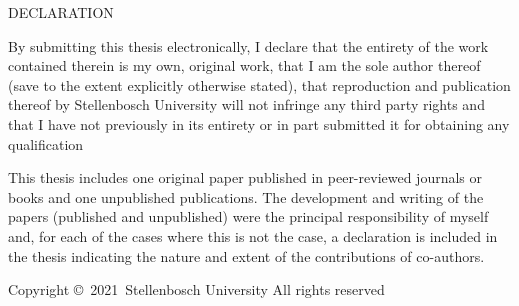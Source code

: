 {}

\pagestyle{empty}
{
	\mbox{}
    \vfill
    \noindent DECLARATION
    \vspace{10pt}

    \noindent
	By submitting this thesis electronically, I declare that the entirety of the work contained therein is my own, original  work, that I am the sole author thereof (save to the extent explicitly otherwise stated), that reproduction and publication thereof by Stellenbosch University will  not infringe any third party rights and that I have not previously in its entirety or in part submitted it for obtaining any qualification

    \vspace{10pt}

	\noindent
	This thesis includes one original paper published in peer-reviewed  journals or books and one unpublished publications. The development and writing of the papers (published and unpublished) were the principal responsibility of myself and, for each of the cases where this is not the case, a declaration is included in the thesis indicating the nature and extent of the contributions of co-authors.

	\mbox{}
    \vfill

    \noindent
	\begin{center}
		\hfill Copyright \copyright\ 2021\, Stellenbosch University \newline
		\hfill All rights reserved
	\end{center}


}

\clearpage
